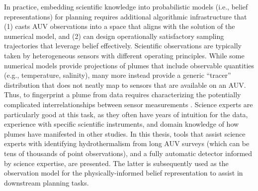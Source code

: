 In practice, embedding scientific knowledge into probabilistic models (i.e., belief representations) for planning requires additional algorithmic infrastructure that (1) casts AUV observations into a space that aligns with the solution of the numerical model, and (2) can design operationally satisfactory sampling trajectories that leverage belief effectively.
Scientific observations are typically taken by heterogeneous sensors with different operating principles.
While some numerical models provide projections of plumes that include observable quantities \autocite{speer1989model} (e.g., temperature, salinity), many more instead provide a generic ``tracer'' distribution that does not neatly map to sensors that are available on an AUV.
Thus, to fingerprint a plume from data requires characterizing the potentially complicated interrelationships between sensor measurements \autocite{jakuba2007stochastic}.
Science experts are particularly good at this task, as they often have years of intuition for the data, experience with specific scientific instruments, and domain knowledge of how plumes have manifested in other studies.
In this thesis, tools that assist science experts with identifying hydrothermalism from long AUV surveys (which can be tens of thousands of point observations), and a fully automatic detector informed by science expertise, are presented.
The latter is subsequently used as the observation model for the physically-informed belief representation to assist in downstream planning tasks.


